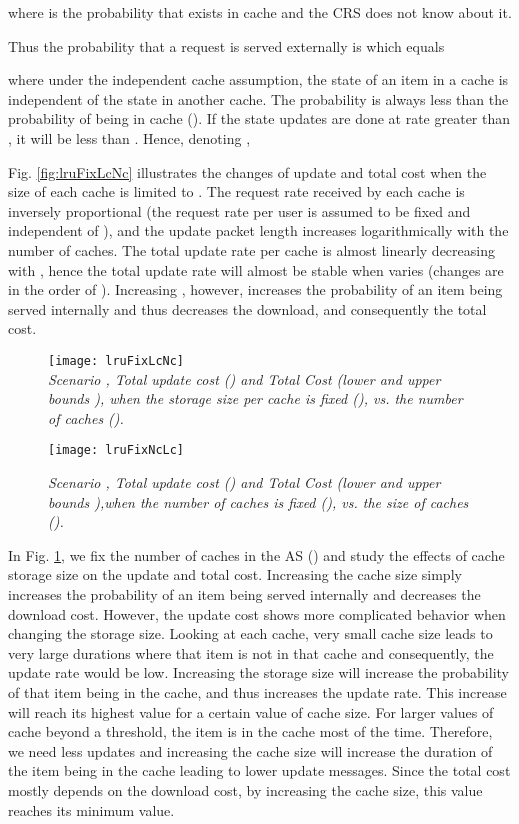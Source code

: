 \documentclass[conference]{IEEEtran}
\theoremstyle{plain}
\theoremstyle{remark}
\begin{document}
where  is the probability that  exists in cache  and the CRS does not know about it.

Thus the probability that a request is served externally is  which equals

where under the independent cache assumption, the state of an item in a cache is independent of the state in another cache. The probability  is always less than the probability of  being in cache  (). If the state updates are done at rate greater than , it will be less than . Hence, denoting , 




Fig. \ref{fig:lruFixLcNc} illustrates the changes of update and total cost when the size of each cache is limited to . The request rate received by each cache is inversely proportional  (the request rate per user is assumed to be fixed and independent of ), and the update packet length increases logarithmically with the number of caches. The total update rate per cache is almost linearly decreasing with , hence the total update rate will almost be stable when  varies (changes are in the order of ). Increasing , however, increases the probability of an item being served internally and thus decreases the download, and consequently the total cost.
\begin{figure}[http]
    \center
      \texttt{[image: lruFixLcNc]}\\
      \caption{\textit{Scenario , Total update cost () and Total Cost (lower  and upper bounds ), when the storage size per cache is fixed (), vs. the number of caches ().}}
        \label{fig:lruFixLcNc}
\texttt{[image: lruFixNcLc]}\\
      \caption{\textit{Scenario , Total update cost () and Total Cost (lower  and upper bounds ),when the number of caches is fixed (), vs. the size of caches ().}}
    \label{fig:lruFixNcLc}
\end{figure}

In Fig. \ref{fig:lruFixNcLc}, we fix the number of caches in the AS () and study the effects of cache storage size on the update and total cost. Increasing the cache size simply increases the probability of an item being served internally and decreases the download cost. However, the update cost shows more complicated behavior when changing the storage size. Looking at each cache, very small cache size leads to very large durations where that item is not in that cache and consequently, the update rate would be low. Increasing the storage size will increase the probability of that item being in the cache, and thus increases the update rate. This increase will reach its highest value for a certain value of cache size.
For larger values of cache beyond a threshold, the item is in the cache most of the time. Therefore, we need less updates and increasing the cache size will increase the duration of the item being in the cache leading to lower update messages. Since the total cost mostly depends on the download cost, by increasing the cache size, this value reaches its minimum value.
\end{document}
